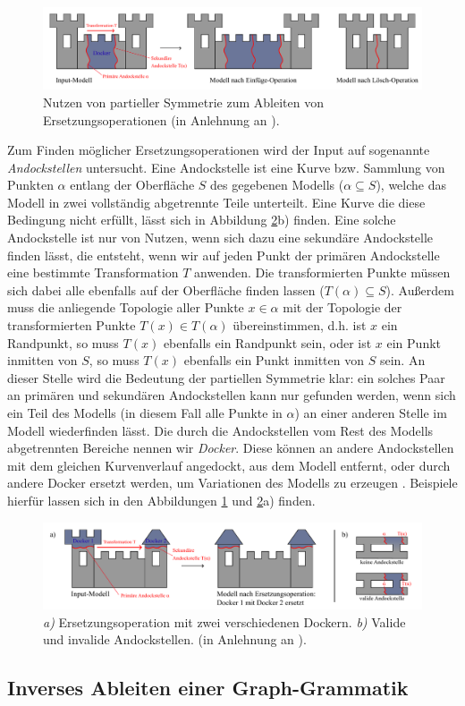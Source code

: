 \begin{figure}[t]
    \centering
    \includegraphics[width=\imgWidth]{images/partial_symmetry.pdf}
    \caption{Nutzen von partieller Symmetrie zum Ableiten von Ersetzungsoperationen (in Anlehnung an \cite{3_bokeloh_et_al}).}
    \label{fig:partial_symmetry}
\end{figure}

Zum Finden möglicher Ersetzungsoperationen wird der Input auf sogenannte \textit{Andockstellen} untersucht. Eine Andockstelle ist eine Kurve bzw.
Sammlung von Punkten \(\alpha\) entlang der Oberfläche \(S\) des gegebenen Modells (\(\alpha \subseteq S\)), welche das Modell in zwei vollständig
abgetrennte Teile unterteilt. Eine Kurve die diese Bedingung nicht erfüllt, lässt sich in Abbildung \ref{fig:partial_symmetry_2}b) finden. Eine solche Andockstelle ist
nur von Nutzen, wenn sich dazu eine sekundäre Andockstelle finden lässt, die entsteht, wenn wir auf jeden Punkt der primären Andockstelle eine
bestimmte Transformation \(T\) anwenden. Die transformierten Punkte müssen sich dabei alle ebenfalls auf der Oberfläche finden lassen
(\(T(\alpha) \subseteq S\)). Außerdem muss die anliegende Topologie aller Punkte \(x \in \alpha\) mit der Topologie der transformierten Punkte
\(T(x) \in T(\alpha)\) übereinstimmen, d.h. ist \(x\) ein Randpunkt, so muss \(T(x)\) ebenfalls ein Randpunkt sein, oder ist \(x\) ein Punkt
inmitten von \(S\), so muss \(T(x)\) ebenfalls ein Punkt inmitten von \(S\) sein. An dieser Stelle wird die Bedeutung der partiellen Symmetrie klar:
ein solches Paar an primären und sekundären Andockstellen kann nur gefunden werden, wenn sich ein Teil des Modells (in diesem Fall alle Punkte in
\(\alpha\)) an einer anderen Stelle im Modell wiederfinden lässt. Die durch die Andockstellen vom Rest des Modells abgetrennten Bereiche nennen wir
\textit{Docker}. Diese können an andere Andockstellen mit dem gleichen Kurvenverlauf angedockt, aus dem Modell entfernt, oder durch
andere Docker ersetzt werden, um Variationen des Modells zu erzeugen \cite{3_bokeloh_et_al}. Beispiele hierfür lassen sich in den Abbildungen
\ref{fig:partial_symmetry} und \ref{fig:partial_symmetry_2}a) finden.

\begin{figure}[t]
    \centering
    \includegraphics[width=\imgWidth]{images/partial_symmetry_2.pdf}
    \caption{\textit{a)} Ersetzungsoperation mit zwei verschiedenen Dockern. \textit{b)} Valide und invalide Andockstellen. (in Anlehnung an \cite{3_bokeloh_et_al}).}
    \label{fig:partial_symmetry_2}
\end{figure}

\subsection{Inverses Ableiten einer Graph-Grammatik}
